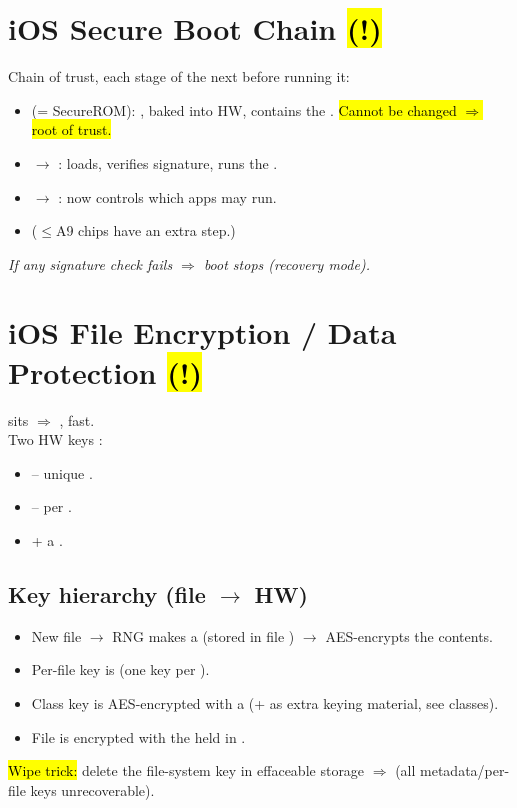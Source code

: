 \section{iOS Secure Boot Chain \hl{(!)}}
Chain of trust, each stage  of the next before running it:
\begin{itemize}
\item {} (= SecureROM): , baked into HW, contains the . \hl{Cannot be changed $\Rightarrow$ root of trust.}
\item $\to$ : loads, verifies signature, runs the .
\item $\to$ : now controls which apps may run.
\item ($\le$A9 chips have an extra  step.)
\end{itemize}
\textit{If any signature check fails $\Rightarrow$ boot stops (recovery mode).}

\section{iOS File Encryption / Data Protection \hl{(!)}}
 sits  $\Rightarrow$ , fast.\\
Two HW keys :
\begin{itemize}
\item {} -- unique .
\item {} -- per .
\item + a .
\end{itemize}
\subsection{Key hierarchy (file $\to$ HW)}
\begin{itemize}
\item New file $\to$ RNG makes a  (stored in file ) $\to$ AES-encrypts the contents.
\item Per-file key is  (one key per ).
\item Class key is AES-encrypted with a  (+  as extra keying material, see classes).
\item File  is encrypted with the  held in .
\end{itemize}
\hl{Wipe trick:} delete the file-system key in effaceable storage $\Rightarrow$  (all metadata/per-file keys unrecoverable).

